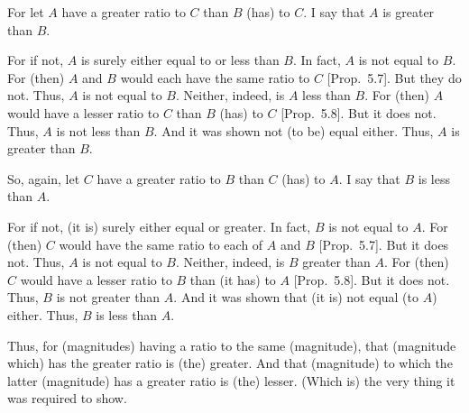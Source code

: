 \begin{Parallel}{}{}
{For let $A$ have a greater ratio to $C$ than $B$ (has) to $C$. I say that $A$ is greater than $B$.

For if not, $A$ is surely either equal to or less than $B$. In fact, $A$ is not
equal to $B$. For (then) $A$ and $B$ would each have the same ratio to $C$ 
 [Prop.~5.7]. But they do not. Thus, $A$
 is not equal to $B$. Neither, indeed, is $A$ less than $B$. For (then)
 $A$ would have a lesser ratio to $C$ than $B$ (has) to $C$ [Prop.~5.8]. But it does not. Thus, $A$ is not less
 than $B$. And it was shown not (to be) equal either. Thus, $A$ is greater than $B$.
 
 So, again, let $C$ have a greater ratio to $B$ than $C$ (has) to $A$. I say that
 $B$ is less than $A$.
 
 For if not, (it is) surely either equal or greater. In fact, $B$ is not equal to 
 $A$. For (then) $C$ would have the same ratio to each of $A$ and $B$  [Prop.~5.7]. But it does not. Thus, $A$ is not equal to $B$. 
 Neither, indeed, is $B$ greater than $A$. For (then) $C$ would have a lesser
 ratio to $B$ than (it has) to $A$ [Prop.~5.8].
 But it does not. Thus, $B$ is not greater than $A$. And it was shown that
  (it is) not equal (to $A$) either. Thus, $B$ is less than $A$.
  
 Thus, for (magnitudes) having a ratio to the same (magnitude), that (magnitude which)
 has the greater  ratio is (the) greater. And that (magnitude) to which the latter (magnitude) has a greater ratio is (the)
lesser. (Which is) the very thing it was required to show.}
\end{Parallel}

